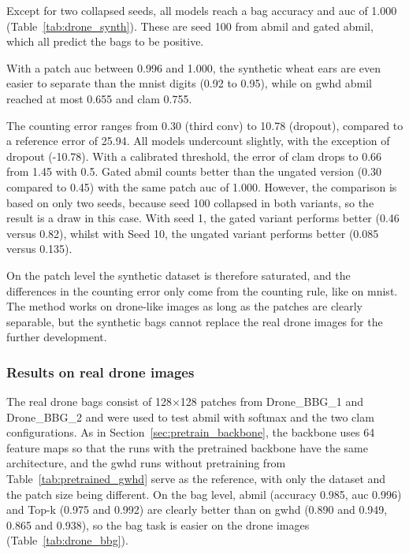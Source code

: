\documentclass[12pt,parskip = half, DIV=classic,listof=totoc]{scrartcl}
\begin{document}
			Except for two collapsed seeds, all models reach a bag accuracy and \ac{auc} of 1.000 (Table~\ref{tab:drone_synth}).
			These are seed 100 from \ac{abmil} and gated \ac{abmil}, which all predict the bags to be positive.

			With a patch \ac{auc} between 0.996 and 1.000, the synthetic wheat ears are even easier to separate than 
			the \ac{mnist} digits (0.92 to 0.95), while on \ac{gwhd} \ac{abmil} reached at most 0.655 and \ac{clam} 0.755.

			The counting error ranges from 0.30 (third conv) 
			to 10.78 (dropout), compared to a reference error of 25.94. All models undercount 
			slightly, with the exception of dropout (-10.78). With a calibrated threshold, the error of 
			\ac{clam} drops to 0.66 from 1.45 with 0.5. Gated \ac{abmil} counts better than the ungated version (0.30 compared to 0.45) 
			with the same patch \ac{auc} of 1.000. 
			However, the comparison is based on only two seeds, because
			seed 100 collapsed in both variants, so the result is a draw in this case. With
			seed 1, the gated variant performs better (0.46 versus 0.82), whilst with Seed 10, the
			ungated variant performs better (0.085 versus 0.135).

			On the patch level the synthetic dataset is therefore saturated, and the differences in the counting 
			error only come from the counting rule, like on \ac{mnist}. The method works on 
			drone-like images as long as the patches are clearly separable, but the synthetic bags 
			cannot replace the real drone images for the further development.

			\subsubsection{Results on real drone images}
			The real drone bags consist of 128×128 patches from Drone\_BBG\_1 and Drone\_BBG\_2 and were used to 
			test \ac{abmil} with softmax and the two \ac{clam} configurations. As in Section~\ref{sec:pretrain_backbone}, 
			the backbone uses 64 feature maps so that the runs with the pretrained backbone 
			have the same architecture, and the \ac{gwhd} runs without pretraining from Table~\ref{tab:pretrained_gwhd} 
			serve as the reference, with only the dataset and the patch size being different. 
			On the bag level, \ac{abmil} (accuracy 0.985, \ac{auc} 0.996) and Top-k (0.975 and 0.992) 
			are clearly better than on \ac{gwhd} (0.890 and 0.949, 0.865 and 0.938), so the bag 
			task is easier on the drone images (Table~\ref{tab:drone_bbg}).
\end{document}
